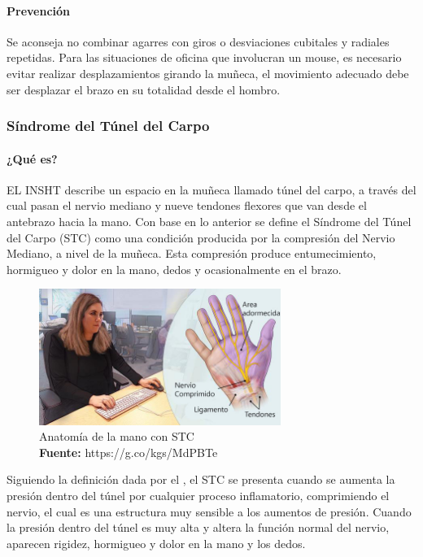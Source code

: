 \paragraph{Prevención}
Se aconseja no combinar agarres con giros o desviaciones cubitales y radiales repetidas. Para las situaciones de oficina que involucran un mouse, es necesario evitar realizar desplazamientos girando la muñeca, el movimiento adecuado debe ser desplazar el brazo en su totalidad desde el hombro. \parencite[5]{INSHT2017TendinitisPulgar}
\subsubsection{Síndrome del Túnel del Carpo}
\paragraph{¿Qué es?}
EL INSHT describe un espacio en la muñeca llamado túnel del carpo, a través del cual pasan el nervio mediano y nueve tendones flexores que van desde el antebrazo hacia la mano\parencite[1]{INSHT2017SindromeCarpiano}. Con base en lo anterior se define el Síndrome del Túnel del Carpo (STC) como una condición producida por la compresión del Nervio Mediano, a nivel de la muñeca. Esta compresión produce entumecimiento, hormigueo y dolor en la mano, dedos y ocasionalmente en el brazo. \parencite[1]{INSHT2017SindromeCarpiano}

\begin{figure}[H]
    \centering
    \includegraphics[width=0.7\textwidth]{Anexos/LATEX/chapters/images/STC.jpg}
    \caption{Anatomía de la mano con STC \\\textbf{Fuente:} https://g.co/kgs/MdPBTe}
    \label{STC}
\end{figure}

Siguiendo la definición dada por el \parencite{INSHT2017SindromeCarpiano}, el STC se presenta cuando se aumenta la presión dentro del túnel por cualquier proceso inflamatorio, comprimiendo el nervio, el cual es una estructura muy sensible a los aumentos de presión. Cuando la presión dentro del túnel es muy alta y altera la función normal del nervio, aparecen rigidez, hormigueo y dolor en la mano y los dedos.
